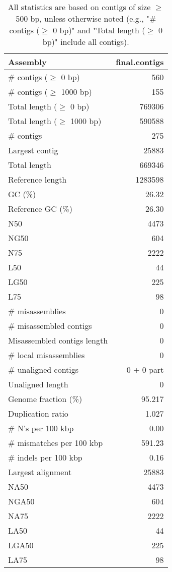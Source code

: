 \documentclass[12pt,a4paper]{article}
\begin{document}
\begin{table}[ht]
\begin{center}
\caption{All statistics are based on contigs of size $\geq$ 500 bp, unless otherwise noted (e.g., "\# contigs ($\geq$ 0 bp)" and "Total length ($\geq$ 0 bp)" include all contigs).}
\begin{tabular}{|l*{1}{|r}|}
\hline
Assembly & final.contigs \\ \hline
\# contigs ($\geq$ 0 bp) & 560 \\ \hline
\# contigs ($\geq$ 1000 bp) & 155 \\ \hline
Total length ($\geq$ 0 bp) & 769306 \\ \hline
Total length ($\geq$ 1000 bp) & 590588 \\ \hline
\# contigs & 275 \\ \hline
Largest contig & 25883 \\ \hline
Total length & 669346 \\ \hline
Reference length & 1283598 \\ \hline
GC (\%) & 26.32 \\ \hline
Reference GC (\%) & 26.30 \\ \hline
N50 & 4473 \\ \hline
NG50 & 604 \\ \hline
N75 & 2222 \\ \hline
L50 & 44 \\ \hline
LG50 & 225 \\ \hline
L75 & 98 \\ \hline
\# misassemblies & 0 \\ \hline
\# misassembled contigs & 0 \\ \hline
Misassembled contigs length & 0 \\ \hline
\# local misassemblies & 0 \\ \hline
\# unaligned contigs & 0 + 0 part \\ \hline
Unaligned length & 0 \\ \hline
Genome fraction (\%) & 95.217 \\ \hline
Duplication ratio & 1.027 \\ \hline
\# N's per 100 kbp & 0.00 \\ \hline
\# mismatches per 100 kbp & 591.23 \\ \hline
\# indels per 100 kbp & 0.16 \\ \hline
Largest alignment & 25883 \\ \hline
NA50 & 4473 \\ \hline
NGA50 & 604 \\ \hline
NA75 & 2222 \\ \hline
LA50 & 44 \\ \hline
LGA50 & 225 \\ \hline
LA75 & 98 \\ \hline
\end{tabular}
\end{center}
\end{table}
\end{document}
